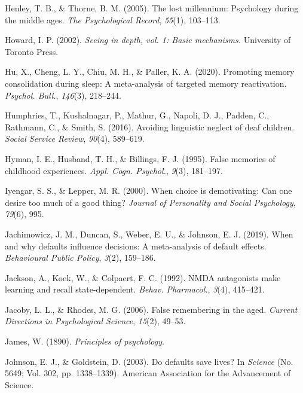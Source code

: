 \documentclass[
]{krantz}
\newlength{\cslhangindent}
\newlength{\cslentryspacingunit} %
\newenvironment{CSLReferences}[2] %
 {%
  \setlength{\parindent}{0pt}
  \ifodd #1
  \let\oldpar\par
  \def\par{\hangindent=\cslhangindent\oldpar}
  \fi
  \setlength{\parskip}{#2\cslentryspacingunit}
 }%
 {}
\begin{document}
\begin{CSLReferences}{1}{0}
\leavevmode{}%
Henley, T. B., \& Thorne, B. M. (2005). The lost millennium: Psychology during the middle ages. \emph{The Psychological Record}, \emph{55}(1), 103--113.

\leavevmode{}%
Howard, I. P. (2002). \emph{Seeing in depth, vol. 1: Basic mechanisms.} University of Toronto Press.

\leavevmode{}%
Hu, X., Cheng, L. Y., Chiu, M. H., \& Paller, K. A. (2020). Promoting memory consolidation during sleep: A meta-analysis of targeted memory reactivation. \emph{Psychol. Bull.}, \emph{146}(3), 218--244.

\leavevmode{}%
Humphries, T., Kushalnagar, P., Mathur, G., Napoli, D. J., Padden, C., Rathmann, C., \& Smith, S. (2016). Avoiding linguistic neglect of deaf children. \emph{Social Service Review}, \emph{90}(4), 589--619.

\leavevmode{}%
Hyman, I. E., Husband, T. H., \& Billings, F. J. (1995). False memories of childhood experiences. \emph{Appl. Cogn. Psychol.}, \emph{9}(3), 181--197.

\leavevmode{}%
Iyengar, S. S., \& Lepper, M. R. (2000). When choice is demotivating: Can one desire too much of a good thing? \emph{Journal of Personality and Social Psychology}, \emph{79}(6), 995.

\leavevmode{}%
Jachimowicz, J. M., Duncan, S., Weber, E. U., \& Johnson, E. J. (2019). When and why defaults influence decisions: A meta-analysis of default effects. \emph{Behavioural Public Policy}, \emph{3}(2), 159--186.

\leavevmode{}%
Jackson, A., Koek, W., \& Colpaert, F. C. (1992). {NMDA} antagonists make learning and recall state-dependent. \emph{Behav. Pharmacol.}, \emph{3}(4), 415--421.

\leavevmode{}%
Jacoby, L. L., \& Rhodes, M. G. (2006). False remembering in the aged. \emph{Current Directions in Psychological Science}, \emph{15}(2), 49--53.

\leavevmode{}%
James, W. (1890). \emph{Principles of psychology}.

\leavevmode{}%
Johnson, E. J., \& Goldstein, D. (2003). Do defaults save lives? In \emph{Science} (No. 5649; Vol. 302, pp. 1338--1339). American Association for the Advancement of Science.


\end{CSLReferences}
\end{document}
